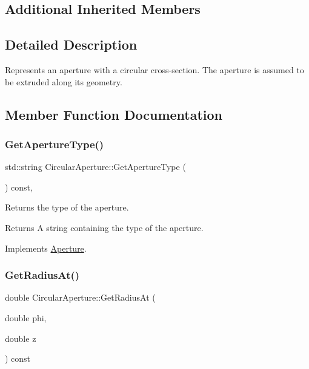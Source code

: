 \subsection*{Additional Inherited Members}


\subsection{Detailed Description}
Represents an aperture with a circular cross-\/section. The aperture is assumed to be extruded along its geometry. 

\subsection{Member Function Documentation}
\mbox{\label{classCircularAperture_a18f05ba1dde35881014ba3aa2ed693bc}} 
\subsubsection{\texorpdfstring{Get\+Aperture\+Type()}{GetApertureType()}}
{\footnotesize\ttfamily std\+::string Circular\+Aperture\+::\+Get\+Aperture\+Type (\begin{DoxyParamCaption}{ }\end{DoxyParamCaption}) const\hspace{0.3cm}{\ttfamily [inline]}, {\ttfamily [virtual]}}

Returns the type of the aperture. \begin{DoxyReturn}{Returns}
A string containing the type of the aperture. 
\end{DoxyReturn}


Implements \hyperlink{classAperture_ad7af612271a0586feea83c38549dfb75}{Aperture}.

\mbox{\label{classCircularAperture_ab2f83be4d78bb1495b2b0aebef78e189}} 
\subsubsection{\texorpdfstring{Get\+Radius\+At()}{GetRadiusAt()}}
{\footnotesize\ttfamily double Circular\+Aperture\+::\+Get\+Radius\+At (\begin{DoxyParamCaption}\item[{double}]{phi,  }\item[{double}]{z }\end{DoxyParamCaption}) const\hspace{0.3cm}{\ttfamily [virtual]}}

